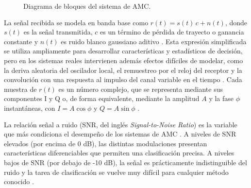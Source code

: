 \begin{figure}[htbp]
\centering
{}
\caption{Diagrama de bloques del sistema de AMC.}
\label{fig:pipeline_amc}
\end{figure}

La señal recibida se modela en banda base como $r(t) = s(t)\,c + n(t)$, donde $s(t)$ es la señal transmitida, $c$ es un término de pérdida de trayecto o ganancia constante y $n(t)$ es ruido blanco gaussiano aditivo \cite{oshea2016convolutional}. Esta expresión simplificada se utiliza ampliamente para desarrollar características y estadísticos de decisión, pero en los sistemas reales intervienen además efectos difíciles de modelar, como la deriva aleatoria del oscilador local, el remuestreo por el reloj del receptor y la convolución con una respuesta al impulso del canal variable en el tiempo \cite{oshea2016convolutional}. Cada muestra de $r(t)$ es un número complejo, que se representa mediante sus componentes I y Q o, de forma equivalente, mediante la amplitud $A$ y la fase $\phi$ instantáneas, con $I = A\cos\phi$ y $Q = A\sin\phi$ \cite{rajendran2018distributed}.

La relación señal a ruido (SNR, del inglés \textit{Signal-to-Noise Ratio}) es la variable que más condiciona el desempeño de los sistemas de AMC \cite{zhu2015automatic,proakis2008digital}. A niveles de SNR elevados (por encima de 0 dB), las distintas modulaciones presentan características diferenciables que permiten una clasificación precisa. A niveles bajos de SNR (por debajo de -10 dB), la señal es prácticamente indistinguible del ruido y la tarea de clasificación se vuelve muy difícil para cualquier método conocido \cite{oshea2018over}.

